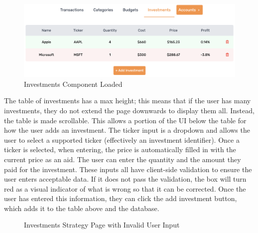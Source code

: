 \begin{figure}[H]
	\centering
	\includegraphics[width=\textwidth]{images/investments_loaded.png}
	\caption{Investments Component Loaded}
	\label{fig:InvestmentsLoaded}
\end{figure}

The table of investments has a max height; this means that if the user has many investments, they do not extend the page downwards to display them all. Instead, the table is made scrollable. This allows a portion of the UI below the table for how the user adds an investment. The ticker input is a dropdown and allows the user to select a supported ticker (effectively an investment identifier). Once a ticker is selected, when entering, the price is automatically filled in with the current price as an aid. The user can enter the quantity and the amount they paid for the investment. These inputs all have client-side validation to ensure the user enters acceptable data. If it does not pass the validation, the box will turn red as a visual indicator of what is wrong so that it can be corrected. Once the user has entered this information, they can click the add investment button, which adds it to the table above and the database.

\vspace{2\baselineskip}

\begin{figure}[H]
	\centering
	\caption{Investments Strategy Page with Invalid User Input}
	\label{fig:InvestmentsError}
\end{figure}

